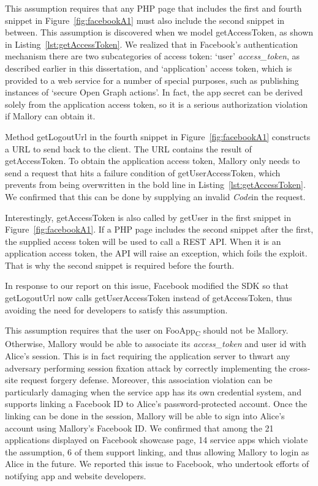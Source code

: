 This assumption requires that any PHP page that includes the first and fourth snippet in Figure~\ref{fig:facebookA1} must also include the second snippet in between.  This assumption is discovered when we model getAccessToken, as shown in Listing~\ref{lst:getAccessToken}.  We realized that in Facebook's authentication mechanism there are two subcategories of access token: `user' \emph{access\_token}, as described earlier in this dissertation, and `application' access token, which is provided to a web service for a number of special purposes, such as publishing instances of `secure Open Graph actions'.  In fact, the app secret can be derived solely from the application access token, so it is a serious authorization violation if Mallory can obtain it. 



Method getLogoutUrl in the fourth snippet in Figure~\ref{fig:facebookA1} constructs a URL to send back to the client.  The URL contains the result of getAccessToken.  To obtain the application access token, Mallory only needs to send a request that hits a failure condition of getUserAccessToken, which prevents  from being overwritten in the bold line in Listing~\ref{lst:getAccessToken}.  We confirmed that this can be done by supplying an invalid \emph{Code}in the request. 

Interestingly, getAccessToken is also called by getUser in the first snippet in Figure~\ref{fig:facebookA1}.  If a PHP page includes the second snippet after the first, the supplied access token will be used to call a REST API.  When it is an application access token, the API will raise an exception, which foils the exploit.  That is why the second snippet is required before the fourth.

In response to our report on this issue, Facebook modified the SDK so that getLogoutUrl now calls getUserAccessToken instead of getAccessToken, thus avoiding the need for developers to satisfy this assumption.

  This assumption requires that the user on FooApp\textsubscript{C} should not be Mallory.  Otherwise, Mallory would be able to associate its \emph{access\_token} and user id with Alice's session.  This is in fact requiring the application server to thwart any adversary performing session fixation attack by correctly implementing the cross-site request forgery defense.  Moreover, this association violation can be particularly damaging when the service app has its own credential system, and supports linking a Facebook ID to Alice’s password-protected account.  Once the linking can be done in the session, Mallory will be able to sign into Alice's account using Mallory's Facebook ID.  We confirmed that among the 21 applications displayed on Facebook showcase page, 14 service apps which violate the assumption, 6 of them support linking, and thus allowing Mallory to login as Alice in the future.  We reported this issue to Facebook, who undertook efforts of notifying app and website developers.

